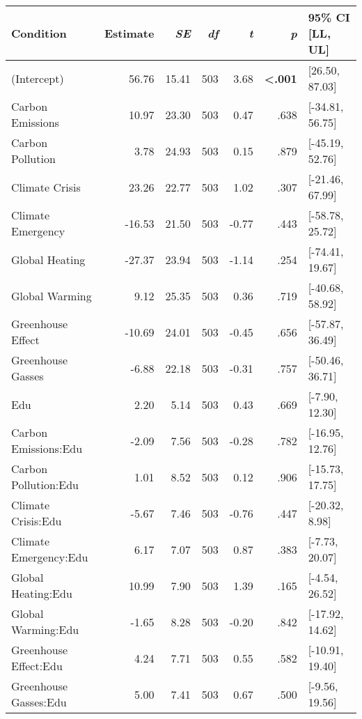\begin{table}[ht]
\centering
\begin{tabular}{lrrrrrl}
  \hline
Condition & Estimate & \textit{SE} & \textit{df} & \textit{t} & \textit{p} & 95\% CI [LL, UL] \\ 
  \hline
(Intercept) & 56.76 & 15.41 & 503 & 3.68 & \textbf{\textless  .001} & [26.50, 87.03] \\ 
  Carbon Emissions & 10.97 & 23.30 & 503 & 0.47 & .638 & [-34.81, 56.75] \\ 
  Carbon Pollution & 3.78 & 24.93 & 503 & 0.15 & .879 & [-45.19, 52.76] \\ 
  Climate Crisis & 23.26 & 22.77 & 503 & 1.02 & .307 & [-21.46, 67.99] \\ 
  Climate Emergency & -16.53 & 21.50 & 503 & -0.77 & .443 & [-58.78, 25.72] \\ 
  Global Heating & -27.37 & 23.94 & 503 & -1.14 & .254 & [-74.41, 19.67] \\ 
  Global Warming & 9.12 & 25.35 & 503 & 0.36 & .719 & [-40.68, 58.92] \\ 
  Greenhouse Effect & -10.69 & 24.01 & 503 & -0.45 & .656 & [-57.87, 36.49] \\ 
  Greenhouse Gasses & -6.88 & 22.18 & 503 & -0.31 & .757 & [-50.46, 36.71] \\ 
  Edu & 2.20 & 5.14 & 503 & 0.43 & .669 & [-7.90, 12.30] \\ 
  Carbon Emissions:Edu & -2.09 & 7.56 & 503 & -0.28 & .782 & [-16.95, 12.76] \\ 
  Carbon Pollution:Edu & 1.01 & 8.52 & 503 & 0.12 & .906 & [-15.73, 17.75] \\ 
  Climate Crisis:Edu & -5.67 & 7.46 & 503 & -0.76 & .447 & [-20.32, 8.98] \\ 
  Climate Emergency:Edu & 6.17 & 7.07 & 503 & 0.87 & .383 & [-7.73, 20.07] \\ 
  Global Heating:Edu & 10.99 & 7.90 & 503 & 1.39 & .165 & [-4.54, 26.52] \\ 
  Global Warming:Edu & -1.65 & 8.28 & 503 & -0.20 & .842 & [-17.92, 14.62] \\ 
  Greenhouse Effect:Edu & 4.24 & 7.71 & 503 & 0.55 & .582 & [-10.91, 19.40] \\ 
  Greenhouse Gasses:Edu & 5.00 & 7.41 & 503 & 0.67 & .500 & [-9.56, 19.56] \\ 
   \hline
\end{tabular}
\end{table}
